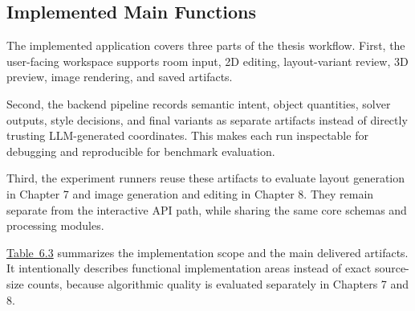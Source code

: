 \subsection{Implemented Main Functions}\label{subsec:implemented-main-functions}

The implemented application covers three parts of the thesis workflow. First, the user-facing workspace supports room input, 2D editing, layout-variant review, 3D preview, image rendering, and saved artifacts.

Second, the backend pipeline records semantic intent, object quantities, solver outputs, style decisions, and final variants as separate artifacts instead of directly trusting LLM-generated coordinates. This makes each run inspectable for debugging and reproducible for benchmark evaluation.

Third, the experiment runners reuse these artifacts to evaluate layout generation in Chapter 7 and image generation and editing in Chapter 8. They remain separate from the interactive API path, while sharing the same core schemas and processing modules.

\hyperref[tab:6-3]{Table~6.3} summarizes the implementation scope and the main delivered artifacts. It intentionally describes functional implementation areas instead of exact source-size counts, because algorithmic quality is evaluated separately in Chapters 7 and 8.


